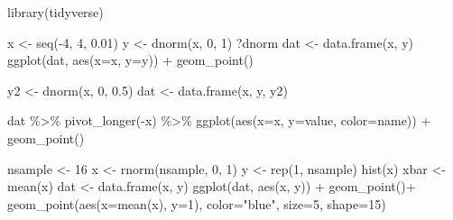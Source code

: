 \documentclass[
]{book}
\newenvironment{Shaded}{\begin{snugshade}}{\end{snugshade}}
\newcommand{\AttributeTok}[1]{\textcolor[rgb]{0.77,0.63,0.00}{#1}}
\newcommand{\DecValTok}[1]{\textcolor[rgb]{0.00,0.00,0.81}{#1}}
\newcommand{\FloatTok}[1]{\textcolor[rgb]{0.00,0.00,0.81}{#1}}
\newcommand{\FunctionTok}[1]{\textcolor[rgb]{0.00,0.00,0.00}{#1}}
\newcommand{\NormalTok}[1]{#1}
\newcommand{\OtherTok}[1]{\textcolor[rgb]{0.56,0.35,0.01}{#1}}
\newcommand{\SpecialCharTok}[1]{\textcolor[rgb]{0.00,0.00,0.00}{#1}}
\newcommand{\StringTok}[1]{\textcolor[rgb]{0.31,0.60,0.02}{#1}}
\begin{document}
\begin{Shaded}
\begin{Highlighting}[]
\FunctionTok{library}\NormalTok{(tidyverse)}

\NormalTok{x }\OtherTok{\textless{}{-}} \FunctionTok{seq}\NormalTok{(}\SpecialCharTok{{-}}\DecValTok{4}\NormalTok{, }\DecValTok{4}\NormalTok{, }\FloatTok{0.01}\NormalTok{)}
\NormalTok{y }\OtherTok{\textless{}{-}} \FunctionTok{dnorm}\NormalTok{(x, }\DecValTok{0}\NormalTok{, }\DecValTok{1}\NormalTok{)}
\NormalTok{?dnorm}
\NormalTok{dat }\OtherTok{\textless{}{-}} \FunctionTok{data.frame}\NormalTok{(x, y)}
\FunctionTok{ggplot}\NormalTok{(dat, }\FunctionTok{aes}\NormalTok{(}\AttributeTok{x=}\NormalTok{x, }\AttributeTok{y=}\NormalTok{y)) }\SpecialCharTok{+}
  \FunctionTok{geom\_point}\NormalTok{()}
\end{Highlighting}
\end{Shaded}

\begin{Shaded}
\begin{Highlighting}[]
\NormalTok{y2 }\OtherTok{\textless{}{-}} \FunctionTok{dnorm}\NormalTok{(x, }\DecValTok{0}\NormalTok{, }\FloatTok{0.5}\NormalTok{)}
\NormalTok{dat }\OtherTok{\textless{}{-}} \FunctionTok{data.frame}\NormalTok{(x, y, y2)}

\NormalTok{dat }\SpecialCharTok{\%\textgreater{}\%} 
  \FunctionTok{pivot\_longer}\NormalTok{(}\SpecialCharTok{{-}}\NormalTok{x) }\SpecialCharTok{\%\textgreater{}\%} 
  \FunctionTok{ggplot}\NormalTok{(}\FunctionTok{aes}\NormalTok{(}\AttributeTok{x=}\NormalTok{x, }\AttributeTok{y=}\NormalTok{value, }\AttributeTok{color=}\NormalTok{name)) }\SpecialCharTok{+}
  \FunctionTok{geom\_point}\NormalTok{()}
\end{Highlighting}
\end{Shaded}

\begin{Shaded}
\begin{Highlighting}[]
\NormalTok{nsample }\OtherTok{\textless{}{-}} \DecValTok{16}
\NormalTok{x }\OtherTok{\textless{}{-}} \FunctionTok{rnorm}\NormalTok{(nsample, }\DecValTok{0}\NormalTok{, }\DecValTok{1}\NormalTok{)}
\NormalTok{y }\OtherTok{\textless{}{-}} \FunctionTok{rep}\NormalTok{(}\DecValTok{1}\NormalTok{, nsample)}
\FunctionTok{hist}\NormalTok{(x)}
\NormalTok{xbar }\OtherTok{\textless{}{-}} \FunctionTok{mean}\NormalTok{(x)}
\NormalTok{dat }\OtherTok{\textless{}{-}} \FunctionTok{data.frame}\NormalTok{(x, y)}
\FunctionTok{ggplot}\NormalTok{(dat, }\FunctionTok{aes}\NormalTok{(x, y)) }\SpecialCharTok{+}
  \FunctionTok{geom\_point}\NormalTok{()}\SpecialCharTok{+}
  \FunctionTok{geom\_point}\NormalTok{(}\FunctionTok{aes}\NormalTok{(}\AttributeTok{x=}\FunctionTok{mean}\NormalTok{(x), }\AttributeTok{y=}\DecValTok{1}\NormalTok{), }\AttributeTok{color=}\StringTok{"blue"}\NormalTok{, }\AttributeTok{size=}\DecValTok{5}\NormalTok{, }\AttributeTok{shape=}\DecValTok{15}\NormalTok{)}
\end{Highlighting}
\end{Shaded}
\end{document}
